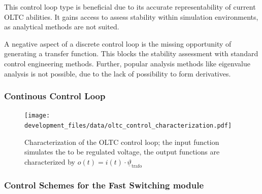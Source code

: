 This control loop type is beneficial due to its accurate representability of current \acs{OLTC} abilities. It gains access to assess stability within simulation environments, as analytical methods are not suited.

A negative aspect of a discrete control loop is the missing opportunity of generating a transfer function. This blocks the stability assessment with standard control engineering methods. Further, popular analysis methods like eigenvalue analysis is not possible, due to the lack of possibility to form derivatives.







\subsubsection{Continous Control Loop}

\begin{figure}[htb!]
        \centering
        \texttt{[image: development\_files/data/oltc\_control\_characterization.pdf]}
        \caption[short]{Characterization of the OLTC control loop; the input function simulates the to be regulated voltage, the output functions are characterized by $o(t)=i(t) \cdot \underline{\vartheta}_\mathrm{trafo}$}
        \label{fig:oltc-control-characterization}
\end{figure}

\subsubsection{Control Schemes for the Fast Switching module}


